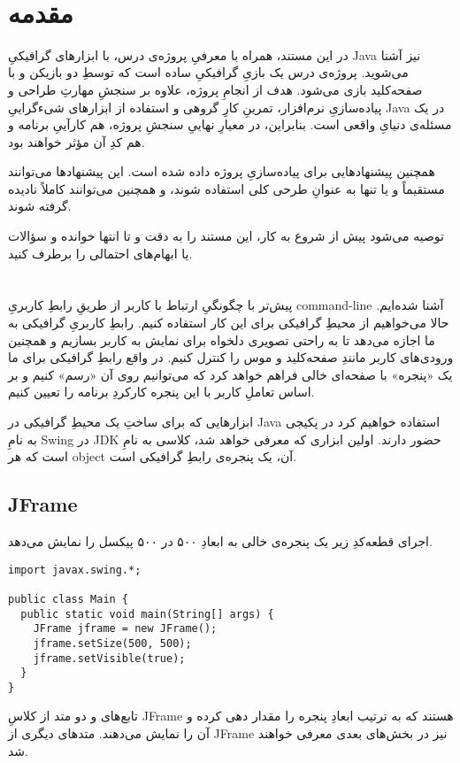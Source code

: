 \documentclass[a4paper,12pt]{paper}
\newcommand{\minti}[1]{\lr{\texttt{#1}}}
\begin{document}
\\

\section*{مقدمه}
در این مستند، همراه با معرفیِ پروژه‌ی درس، با ابزارهای گرافیکیِ {\en Java} نیز آشنا می‌شوید. پروژه‌ی درس یک بازیِ گرافیکیِ ساده است که توسطِ دو بازیکن و با صفحه‌کلید بازی می‌شود. هدف از انجامِ پروژه، علاوه بر سنجشِ مهارتِ طراحی و پیاده‌سازیِ نرم‌افزار، تمرینِ کارِ گروهی و استفاده‌  از ابزارهای شیء‌گراییِ {\en Java} در یک مسئله‌ی دنیایِ واقعی است. بنابراین، در معیارِ نهاییِ سنجشِ پروژه، هم کارآییِ برنامه و هم کدِ آن مؤثر خواهند بود.

همچنین پیشنهادهایی برای پیاده‌سازیِ پروژه داده شده است. این پیشنهادها می‌توانند مستقیماً و یا تنها به عنوانِ طرحی کلی استفاده شوند، و همچنین می‌توانند کاملاً نادیده گرفته شوند.

توصیه می‌شود پیش از شروع به کار، این مستند را به دقت و تا انتها خوانده و سؤالات یا ابهام‌های احتمالی را برطرف کنید.

\section{}
پیش‌تر با چگونگیِ ارتباط با کاربر از طریقِ رابطِ کاربریِ {\en command-line} آشنا شده‌ایم. حالا می‌خواهیم از محیطِ گرافیکی برای این کار استفاده کنیم. رابطِ کاربریِ گرافیکی به ما اجازه می‌دهد تا به راحتی تصویری دلخواه برای نمایش به کاربر بسازیم و همچنین ورودی‌های کاربر مانندِ صفحه‌کلید و موس را کنترل کنیم. در واقع رابطِ گرافیکی برای ما یک «پنجره» با صفحه‌ای خالی فراهم خواهد کرد که می‌توانیم روی آن «رسم» کنیم و بر اساس تعاملِ کاربر با این پنجره کارکردِ برنامه را تعیین کنیم.

ابزارهایی که برای ساختِ یک محیطِ گرافیکی در {\en Java} استفاده خواهیم کرد در پکیجی به نامِ {\en Swing} در {\en JDK} حضور دارند. اولین ابزاری که معرفی خواهد شد، کلاسی به نامِ \minti{JFrame} است که هر {\en object}ِ آن، یک پنجره‌ی رابطِ گرافیکی است.

\subsection{\en JFrame}
اجرای قطعه‌کدِ زیر یک پنجره‌ی خالی به ابعادِ ۵۰۰ در ۵۰۰ پیکسل را نمایش می‌دهد.

\begin{verbatim}
import javax.swing.*;

public class Main {
  public static void main(String[] args) {
    JFrame jframe = new JFrame();
    jframe.setSize(500, 500);
    jframe.setVisible(true);
  }
}
\end{verbatim}
تابع‌های \minti{.setSize()} و \minti{.setVisible()} دو متد از کلاسِ {\en JFrame} هستند که به ترتیب ابعادِ پنجره را مقدار دهی کرده و آن را نمایش می‌دهند. متدهای دیگری از {\en JFrame} نیز در بخش‌های بعدی معرفی خواهند شد.
\end{document}

